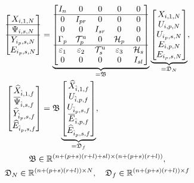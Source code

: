 \begin{alignat}{2}
    \begin{bmatrix}
        X_{i,1,N}\\
        \hline
        \Psi_{i,s,N}\\
        \hline
        Y_{i_p,s,N}\\
        E_{i_p,s,N}
    \end{bmatrix}&=
    \underbrace{\begin{bmatrix}
        I_n      & 0      & 0       & 0 & 0\\
        \hline
        0        & I_{pr} & 0       & 0 & 0\\
        0        & 0      & I_{sr}  & 0 & 0\\
        \Gamma_p & \mathcal{T}_p^\mathrm{u} & 0 & \mathcal{H}_p & 0\\
        \hline
        \varepsilon_1 & \varepsilon_2 & \mathcal{T}_s^\mathrm{u} & \varepsilon_3 & \mathcal{H}_s\\
        0 & 0 & 0 & 0 & I_{sl}
    \end{bmatrix}}_{=\mathfrak{B}}
    \underbrace{\begin{bmatrix}
        X_{i,1,N}\\
        U_{i,p,N}\\
        U_{i_p,s,N}\\
        E_{i,p,N}\\
        E_{i_p,s,N}
    \end{bmatrix}}_{=\mathfrak{D}_N},\notag\\%
    \begin{bmatrix}
        \widehat{X}_{\hat{i},1,f}\\
        \overline{\Psi}_{\hat{i},s,f}\\
        \widehat{Y}_{\hat{i}_p,s,f}\\
        \widehat{E}_{\hat{i}_p,s,f}
    \end{bmatrix}&=
    \mathfrak{B}
    \underbrace{\begin{bmatrix}
        \widehat{X}_{\hat{i},1,f}\\
        U_{\hat{i},p,f}\\
        U_{\hat{i}_p,s,f}\\
        \overline{E}_{\hat{i},p,f}\\
        \widehat{E}_{\hat{i}_p,s,f}
    \end{bmatrix}}_{=\mathfrak{D}_f},\label{eq:BD_f}\\%
    \span\mathfrak{B}\in\mathbb{R}^{(n+(p+s)(r+l)+sl)\times (n+(p+s)(r+l))},\notag\\
    \span\mathfrak{D}_N\in\mathbb{R}^{(n+(p+s)(r+l))\times N},\quad \mathfrak{D}_f\in\mathbb{R}^{(n+(p+s)(r+l))\times f}\notag
\end{alignat}
